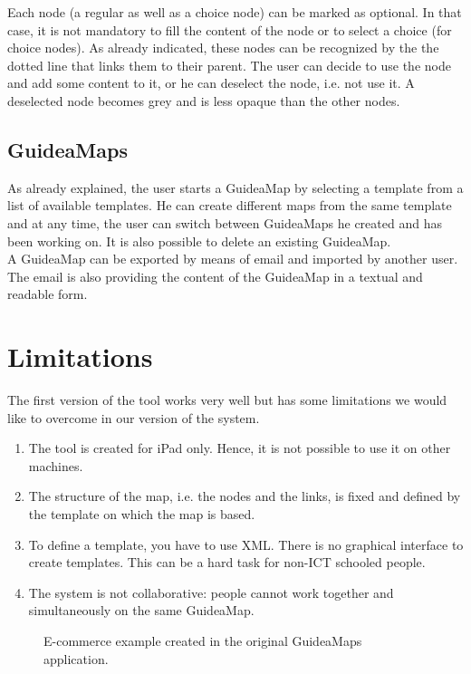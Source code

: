 Each node (a regular as well as a choice node) can be marked as optional. In that case, it is not mandatory to fill the content of the node or to select a choice (for choice nodes). As already indicated, these nodes can be recognized by the the dotted line that links them to their parent. The user can decide to use the node and add some content to it, or he can deselect the node, i.e. not use it. A deselected node becomes grey and is less opaque than the other nodes.

\subsection{GuideaMaps}
As already explained, the user starts a GuideaMap by selecting a template from a list of available templates. He can create different maps from the same template and at any time, the user can switch between GuideaMaps he created and has been working on. It is also possible to delete an existing GuideaMap.\\

A GuideaMap can be exported by means of email and imported by another user. The email is also providing the content of the GuideaMap in a textual and readable form.

\section{Limitations}\label{sec:guidamaps-limitations}
The first version of the tool works very well but has some limitations we would like to overcome in our version of the system.
\begin{enumerate}
	\item The tool is created for iPad only. Hence, it is not possible to use it on other machines.
	\item The structure of the map, i.e. the nodes and the links, is fixed and defined by the template on which the map is based.
	\item To define a template, you have to use XML. There is no graphical interface to create templates. This can be a hard task for non-ICT schooled people.
	\item The system is not collaborative: people cannot work together and simultaneously on the same GuideaMap.
\end{enumerate}

\begin{figure}[H]
	\centering
	\caption{E-commerce example created in the original GuideaMaps application.}
	\label{fig:gm1.0-ecommerce}
\end{figure}


